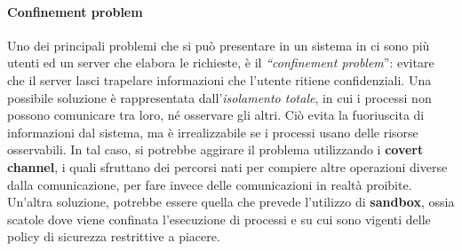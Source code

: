 \paragraph{Confinement problem}
Uno dei principali problemi che si può presentare in un sistema in ci sono più
utenti ed un server che elabora le richieste, è il \textit{``confinement problem}'':
evitare che il server lasci trapelare informazioni che l'utente ritiene
confidenziali.
Una possibile soluzione è rappresentata dall’\textit{isolamento totale},
in cui i processi non possono comunicare tra loro, né osservare gli altri.
Ciò evita la fuoriuscita di informazioni dal sistema, ma è
irrealizzabile se i processi usano delle risorse osservabili. In tal caso,
si potrebbe aggirare il
problema utilizzando i \textbf{covert channel}, i quali sfruttano dei percorsi
nati per compiere altre operazioni diverse dalla comunicazione, per fare invece
delle comunicazioni in realtà proibite. Un’altra
soluzione, potrebbe essere quella che prevede l’utilizzo di \textbf{sandbox},
ossia scatole dove viene confinata l'esecuzione di processi e su cui sono
vigenti delle policy di sicurezza restrittive a piacere.